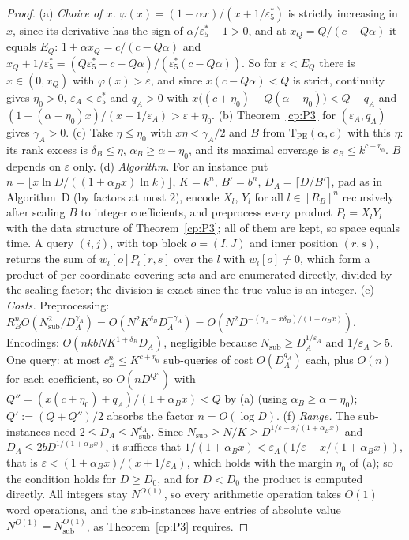 \documentclass[11pt]{article}
\theoremstyle{definition}
\theoremstyle{remark}
\providecommand{\eps}{\varepsilon}
\newcommand{\es}{\varepsilon^*_5}             %
\newcommand{\cB}{c_B}                         %
\newcommand{\delB}{\delta_B}                  %
\newcommand{\alB}{\alpha_B}                   %
\newcommand{\RB}{R_B}                         %
\newcommand{\TPE}{\mathrm{T}_{\mathrm{PE}}}   %
\newcommand{\AlgD}{Algorithm~D}                             %
\begin{document}
\begin{proof}
(a) \emph{Choice of $x$.} $\varphi(x)=(1+\alpha x)/(x+1/\es)$ is strictly increasing in $x$, since its derivative has the sign of $\alpha/\es-1>0$, and at $x_Q=Q/(c-Q\alpha)$ it equals $E_Q$: $1+\alpha x_Q=c/(c-Q\alpha)$ and $x_Q+1/\es=(Q\es+c-Q\alpha)/(\es(c-Q\alpha))$. So for $\eps<E_Q$ there is $x\in(0,x_Q)$ with $\varphi(x)>\eps$, and since $x(c-Q\alpha)<Q$ is strict, continuity gives $\eta_0>0$, $\eps_A<\es$ and $q_A>0$ with $x\bigl((c+\eta_0)-Q(\alpha-\eta_0)\bigr)<Q-q_A$ and $(1+(\alpha-\eta_0)x)/(x+1/\eps_A)>\eps+\eta_0$.
(b) Theorem~\ref{cp:P3} for $(\eps_A,q_A)$ gives $\gamma_A>0$.
(c) Take $\eta\le\eta_0$ with $x\eta<\gamma_A/2$ and $B$ from $\TPE(\alpha,c)$ with this $\eta$: its rank excess is $\delB\le\eta$, $\alB\ge\alpha-\eta_0$, and its maximal coverage is $\cB\le k^{c+\eta_0}$. $B$ depends on $\eps$ only.
(d) \emph{Algorithm.} For an instance put $n=\lfloor x\ln D/((1+\alB x)\ln k)\rfloor$, $K=k^n$, $B'=b^n$, $D_A=\lceil D/B'\rceil$, pad as in \AlgD{} (by factors at most $2$), encode $X_l$, $Y_l$ for all $l\in[\RB]^n$ recursively after scaling $B$ to integer coefficients, and preprocess every product $P_l=X_lY_l$ with the data structure of Theorem~\ref{cp:P3}; all of them are kept, so space equals time. A query $(i,j)$, with top block $o=(I,J)$ and inner position $(r,s)$, returns the sum of $w_l[o]P_l[r,s]$ over the $l$ with $w_l[o]\ne0$, which form a product of per-coordinate covering sets and are enumerated directly, divided by the scaling factor; the division is exact since the true value is an integer.
(e) \emph{Costs.} Preprocessing: $\RB^nO(N_{\mathrm{sub}}^2/D_A^{\gamma_A})=O(N^2K^{\delB}D_A^{-\gamma_A})=O(N^2D^{-(\gamma_A-x\delB)/(1+\alB x)})$. Encodings: $O(nkbNK^{1+\delB}D_A)$, negligible because $N_{\mathrm{sub}}\ge D_A^{1/\eps_A}$ and $1/\eps_A>5$. One query: at most $\cB^n\le K^{c+\eta_0}$ sub-queries of cost $O(D_A^{q_A})$ each, plus $O(n)$ for each coefficient, so $O(nD^{Q''})$ with $Q''=(x(c+\eta_0)+q_A)/(1+\alB x)<Q$ by (a) (using $\alB\ge\alpha-\eta_0$); $Q':=(Q+Q'')/2$ absorbs the factor $n=O(\log D)$.
(f) \emph{Range.} The sub-instances need $2\le D_A\le N_{\mathrm{sub}}^{\eps_A}$. Since $N_{\mathrm{sub}}\ge N/K\ge D^{1/\eps-x/(1+\alB x)}$ and $D_A\le2bD^{1/(1+\alB x)}$, it suffices that $1/(1+\alB x)<\eps_A(1/\eps-x/(1+\alB x))$, that is $\eps<(1+\alB x)/(x+1/\eps_A)$, which holds with the margin $\eta_0$ of (a); so the condition holds for $D\ge D_0$, and for $D<D_0$ the product is computed directly. All integers stay $N^{O(1)}$, so every arithmetic operation takes $O(1)$ word operations, and the sub-instances have entries of absolute value $N^{O(1)}=N_{\mathrm{sub}}^{O(1)}$, as Theorem~\ref{cp:P3} requires.
\end{proof}
\end{document}
